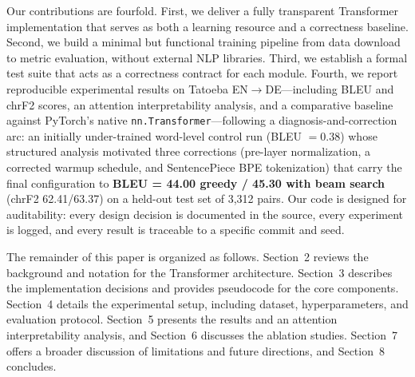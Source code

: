 Our contributions are fourfold. First, we deliver a fully transparent Transformer implementation that serves as both a learning resource and a correctness baseline. Second, we build a minimal but functional training pipeline from data download to metric evaluation, without external NLP libraries. Third, we establish a formal test suite that acts as a correctness contract for each module. Fourth, we report reproducible experimental results on Tatoeba EN$\rightarrow$DE---including BLEU and chrF2 scores, an attention interpretability analysis, and a comparative baseline against PyTorch's native \texttt{nn.Transformer}---following a diagnosis-and-correction arc: an initially under-trained word-level control run (BLEU $= 0.38$) whose structured analysis motivated three corrections (pre-layer normalization, a corrected warmup schedule, and SentencePiece BPE tokenization) that carry the final configuration to \textbf{BLEU = 44.00 greedy / 45.30 with beam search} (chrF2 62.41/63.37) on a held-out test set of 3,312 pairs. Our code is designed for auditability: every design decision is documented in the source, every experiment is logged, and every result is traceable to a specific commit and seed.

The remainder of this paper is organized as follows. Section~2 reviews the background and notation for the Transformer architecture. Section~3 describes the implementation decisions and provides pseudocode for the core components. Section~4 details the experimental setup, including dataset, hyperparameters, and evaluation protocol. Section~5 presents the results and an attention interpretability analysis, and Section~6 discusses the ablation studies. Section~7 offers a broader discussion of limitations and future directions, and Section~8 concludes.
